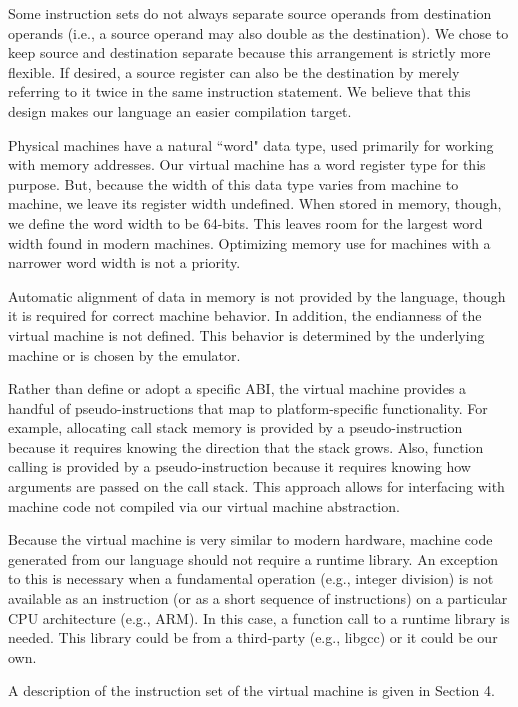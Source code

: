 Some instruction sets do not always separate source operands from
destination operands (i.e., a source operand may also double as the destination).
We chose to keep source and destination separate because this arrangement
is strictly more flexible. If desired, a source register can also be the
destination by merely referring to it twice in the same instruction statement.
We believe that this design makes our language an easier compilation target.

Physical machines have a natural ``word" data type, used primarily
for working with memory addresses. Our virtual machine has a word register
type for this purpose. But, because the width of this data type
varies from machine to machine, we leave its register width undefined.
When stored in memory, though, we define the word width to be 64-bits.
This leaves room for the largest word width found in modern machines.
Optimizing memory use for machines with a narrower word width is not a priority.

Automatic alignment of data in memory is not provided by the language,
though it is required for correct machine behavior.
In addition, the endianness of the virtual machine is not defined. This behavior
is determined by the underlying machine or is chosen by the emulator.

Rather than define or adopt a specific ABI, the virtual machine provides a
handful of pseudo-instructions that map to platform-specific functionality.
For example, allocating call stack memory is provided by a pseudo-instruction
because it requires knowing the direction that the stack grows.
Also, function calling is provided by a pseudo-instruction because
it requires knowing how arguments are passed on the call stack.
This approach allows for interfacing with machine code not compiled
via our virtual machine abstraction.

Because the virtual machine is very similar to modern hardware,
machine code generated from our language should not require a
runtime library. An exception to this is necessary when a fundamental operation
(e.g., integer division) is not available as an instruction (or as a short
sequence of instructions) on a particular CPU architecture (e.g., ARM).
In this case, a function call to a runtime library is needed.
This library could be from a third-party (e.g., libgcc) or it could
be our own.

A description of the instruction set of the virtual machine
is given in Section 4.
